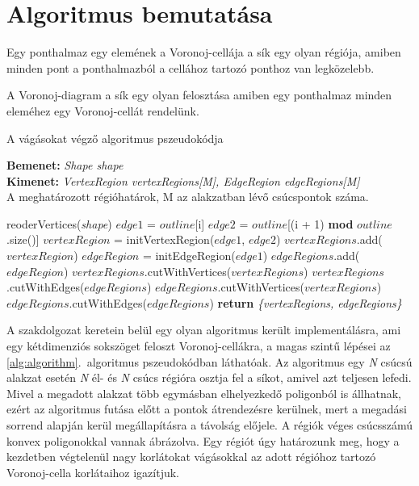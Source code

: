 \section{Algoritmus bemutatása}

\begin{definition}
	Egy ponthalmaz egy elemének a Voronoj-cellája\cite{voronoj} a sík egy olyan régiója, amiben minden pont a ponthalmazból a cellához tartozó ponthoz van legközelebb.
\end{definition}

\begin{definition}
	A Voronoj-diagram a sík egy olyan felosztása amiben egy ponthalmaz minden eleméhez egy Voronoj-cellát rendelünk.
\end{definition}

\begin{algorithm}[H]
	\caption{A vágásokat végző algoritmus pszeudokódja}
	\label{alg:algorithm}
	\textbf{Bemenet:} \textit{Shape shape} \\
	\textbf{Kimenet:} \textit{VertexRegion vertexRegions[M], EdgeRegion edgeRegions[M]}\\A meghatározott régióhatárok, M az alakzatban lévő csúcspontok száma.
	\begin{algorithmic}[1]
		\State reoderVertices(\textit{shape})
		\State $edge1$ = $outline$[i]
		\State $edge2$ = $outline$[(i + 1) \textbf{mod} $outline$.size()]
		\State $vertexRegion$ = initVertexRegion($edge1$, $edge2$)
		\State $vertexRegions$.add($vertexRegion$)
		\State $edgeRegion$ = initEdgeRegion($edge1$)
		\State $edgeRegions$.add($edgeRegion$)
		\EndFor
		\EndFor
		\State $vertexRegions$.cutWithVertices($vertexRegions$)
		\State $vertexRegions$.cutWithEdges($edgeRegions$)
		\State $edgeRegions$.cutWithVertices($vertexRegions$)
		\State $edgeRegions$.cutWithEdges($edgeRegions$)
		\State \textbf{return} \textit{\{vertexRegions, edgeRegions\}}
	\end{algorithmic}
\end{algorithm}

A szakdolgozat keretein belül egy olyan algoritmus\cite{sdfalgorithmpaper} került implementálásra, ami egy kétdimenziós sokszöget feloszt Voronoj-cellákra, a magas szintű lépései az \ref{alg:algorithm}.~algoritmus pszeudokódban láthatóak. Az algoritmus egy \textit{N} csúcsú alakzat esetén \textit{N} él- és \textit{N} csúcs régióra osztja fel a síkot, amivel azt teljesen lefedi. Mivel a megadott alakzat több egymásban elhelyezkedő poligonból is állhatnak, ezért az algoritmus futása előtt a pontok átrendezésre kerülnek, mert a megadási sorrend alapján kerül megállapításra a távolság előjele. A régiók véges csúcsszámú konvex poligonokkal vannak ábrázolva. Egy régiót úgy határozunk meg, hogy a kezdetben végtelenül nagy korlátokat vágásokkal az adott régióhoz tartozó Voronoj-cella korlátaihoz igazítjuk.

